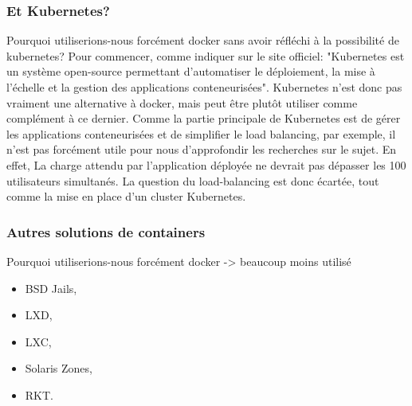 \documentclass[
    iai, %
    il, %
]{heig-tb}
\begin{document}
\subsubsection{Et Kubernetes?}
Pourquoi utiliserions-nous forcément docker sans avoir réfléchi à la possibilité de \Gls{kubernetes}?
Pour commencer, comme indiquer sur le site officiel:
"Kubernetes est un système open-source permettant d'automatiser le déploiement, la mise à l'échelle et la gestion des applications conteneurisées".
Kubernetes n'est donc pas vraiment une alternative à docker, mais peut être plutôt utiliser comme complément à ce dernier.
Comme la partie principale de Kubernetes est de gérer les applications conteneurisées et de simplifier le load balancing, par exemple, il n'est pas forcément utile pour nous d'approfondir les recherches sur le sujet.
En effet, La charge attendu par l'application déployée ne devrait pas dépasser les 100 utilisateurs simultanés. La question du load-balancing est donc écartée, tout comme la mise en place d'un cluster Kubernetes.




\subsubsection{Autres solutions de containers}
Pourquoi utiliserions-nous forcément \Gls{docker}
-> beaucoup moins utilisé

\begin{itemize}
    \item BSD Jails, %
    \item LXD, %
    \item LXC, %
    \item Solaris Zones, %
    \item RKT. %
\end{itemize}
\end{document}
